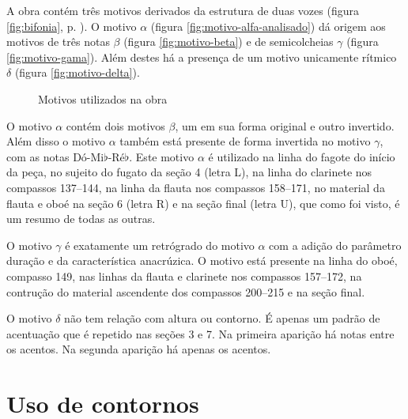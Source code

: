 A obra contém três motivos derivados da estrutura de duas vozes
(figura \ref{fig:bifonia}, p. \pageref{fig:bifonia}). O motivo
$\alpha$ (figura \ref{fig:motivo-alfa-analisado}) dá origem aos
motivos de três notas $\beta$ (figura \ref{fig:motivo-beta}) e de
semicolcheias $\gamma$ (figura \ref{fig:motivo-gama}). Além destes há
a presença de um motivo unicamente rítmico $\delta$ (figura
\ref{fig:motivo-delta}).

\begin{figure}
  \centering


  \caption{Motivos utilizados na obra}
  \label{fig:motivos-utilizados}
\end{figure}

O motivo $\alpha$ contém dois motivos $\beta$, um em sua forma
original e outro invertido. Além disso o motivo $\alpha$ também está
presente de forma invertida no motivo $\gamma$, com as notas
Dó-Mi$\flat$-Ré$\flat$. Este motivo $\alpha$ é utilizado na linha do
fagote do início da peça, no sujeito do fugato da seção 4 (letra L),
na linha do clarinete nos compassos 137--144, na linha da flauta nos
compassos 158--171, no material da flauta e oboé na seção 6 (letra R)
e na seção final (letra U), que como foi visto, é um resumo de todas
as outras.

O motivo $\gamma$ é exatamente um retrógrado do motivo $\alpha$ com a
adição do parâmetro duração e da característica anacrúzica. O motivo
está presente na linha do oboé, compasso 149, nas linhas da flauta e
clarinete nos compassos 157--172, na contrução do material ascendente
dos compassos 200--215 e na seção final.

O motivo $\delta$ não tem relação com altura ou contorno. É apenas um
padrão de acentuação que é repetido nas seções 3 e 7. Na primeira
aparição há notas  entre os acentos. Na segunda aparição
há apenas os acentos.

\section{Uso de contornos}
\label{sec:uso-de-contornos}

